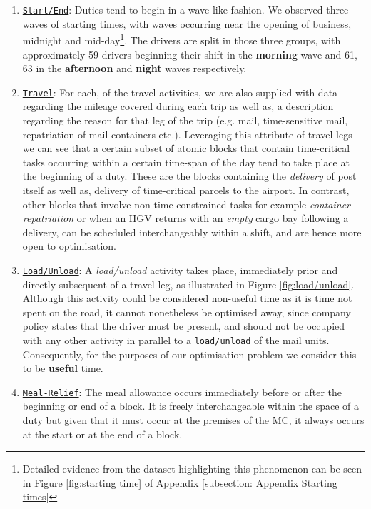 \begin{enumerate}
    
    \item \underline{\texttt{Start/End}}: Duties tend to begin in a wave-like fashion. We observed three waves of starting times, with waves occurring near the opening of business, midnight and mid-day\footnote{Detailed evidence from the dataset highlighting this phenomenon can be seen in Figure \ref{fig:starting time} of Appendix \ref{subsection: Appendix Starting times}}. The drivers are split in those three groups, with approximately 59 drivers beginning their shift in the \textbf{morning} wave and 61, 63 in the \textbf{afternoon} and \textbf{night} waves respectively.  
    
    \item \underline{\texttt{Travel}}: For each, of the travel activities, we are also supplied with data regarding the mileage covered during each trip as well as, a description regarding the reason for that leg of the trip (e.g. mail, time-sensitive mail, repatriation of mail containers etc.). Leveraging this attribute of travel legs we can see that a certain subset of atomic blocks that contain time-critical tasks occurring within a certain time-span of the day tend to take place at the beginning of a duty. These are the blocks containing the \textit{delivery} of post itself as well as, delivery of time-critical parcels to the airport. In contrast, other blocks that involve non-time-constrained tasks for example \textit{container repatriation} or when an HGV returns with an \textit{empty} cargo bay following a delivery, can be scheduled interchangeably within a shift, and are hence more open to optimisation.
    
    \item \underline{\texttt{Load/Unload}}: A \textit{load/unload} activity takes place, immediately prior and directly subsequent of a travel leg, as illustrated in Figure \ref{fig:load/unload}. Although this activity  could be considered non-useful time as it is time not spent on the road, it cannot nonetheless be optimised away, since company policy states that the driver must be present, and should not be occupied with any other activity in parallel to a \texttt{load/unload} of the mail units. Consequently, for the purposes of our optimisation problem we consider this to be \textbf{useful} time.  
    
    \item \underline{\texttt{Meal-Relief}}: The meal allowance occurs immediately before or after the beginning or end of a block. It is freely interchangeable within the space of a duty but given that it must occur at the premises of the MC, it always occurs at the start or at the end of a block.        
    

\end{enumerate}
